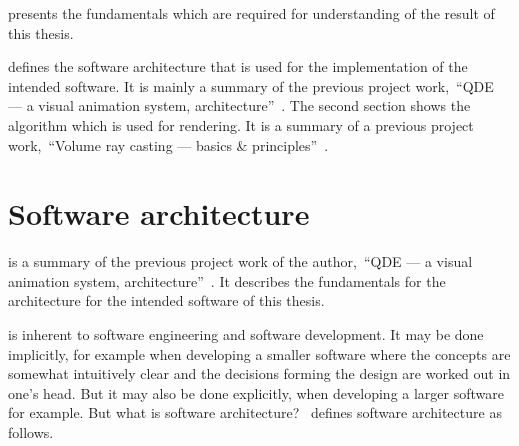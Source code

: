\documentclass[%
    a4paper,    %
    justified,  %
    nobib,      %
    openany     %
]{tufte-book}
\begin{document}
 presents the fundamentals which are required for
understanding of the result of this thesis.

 defines the software architecture
that is used for the implementation of the intended software. It is mainly a
summary of the previous project work,~\enquote{QDE --- a visual animation
system, architecture}~\cite{osterwalder-qde-2016}. The second section shows the
algorithm which is used for rendering. It is a summary of a previous project
work,~\enquote{Volume ray casting --- basics \&
principles}~\cite{osterwalder-volume-2016}.

\section{Software architecture}
\label{soarch}

 is a summary of the previous
project work of the author,~\enquote{QDE --- a visual animation system,
architecture}~\cite{osterwalder-qde-2016}. It describes the fundamentals for the
architecture for the intended software of this thesis.

 is inherent to software engineering and
software development. It may be done implicitly, for example when developing a
smaller software where the concepts are somewhat intuitively clear and the
decisions forming the design are worked out in one's head. But it may also be
done explicitly, when developing a larger software for example. But what is
software architecture?~\citeauthor{kruchten_rup_2003} defines software
architecture as follows.
\end{document}
